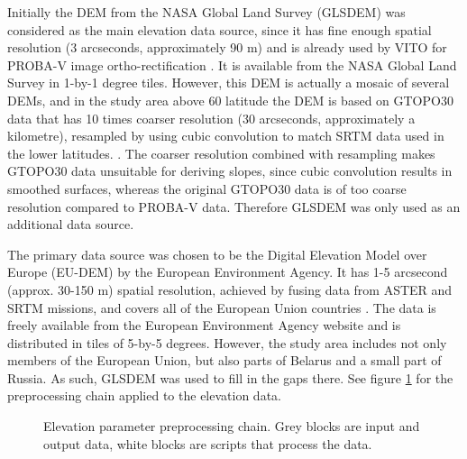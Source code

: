 \documentclass[a4paper,12pt]{scrbook}
\begin{document}
Initially the DEM from the NASA Global Land Survey (GLSDEM) was considered as the main elevation data source, since it has fine enough spatial resolution (3 arcseconds, approximately 90 m) and is already used by VITO for PROBA-V image ortho-rectification \citep{probavguide}. It is available from the NASA Global Land Survey in 1-by-1 degree tiles. However, this DEM is actually a mosaic of several DEMs, and in the study area above 60\textdegree{} latitude the DEM is based on GTOPO30 data that has 10 times coarser resolution (30 arcseconds, approximately a kilometre), resampled by using cubic convolution to match SRTM data used in the lower latitudes. \citep{glsdemtechguide}. The coarser resolution combined with resampling makes GTOPO30 data unsuitable for deriving slopes, since cubic convolution results in smoothed surfaces, whereas the original GTOPO30 data is of too coarse resolution compared to PROBA-V data. Therefore GLSDEM was only used as an additional data source.

The primary data source was chosen to be the Digital Elevation Model over Europe (EU-DEM) by the European Environment Agency. It has 1-5 arcsecond (approx. 30-150 m) spatial resolution, achieved by fusing data from ASTER and SRTM missions, and covers all of the European Union countries \citep{bashfield2011eudem}. The data is freely available from the European Environment Agency website and is distributed in tiles of 5-by-5 degrees. However, the study area includes not only members of the European Union, but also parts of Belarus and a small part of Russia. As such, GLSDEM was used to fill in the gaps there. See figure \ref{fig-elevation-preprocessing} for the preprocessing chain applied to the elevation data.

\begin{figure}
  \centering
  \caption{Elevation parameter preprocessing chain. Grey blocks are input and output data, white blocks are scripts that process the data.}
  \label{fig-elevation-preprocessing}
\end{figure}
\end{document}

